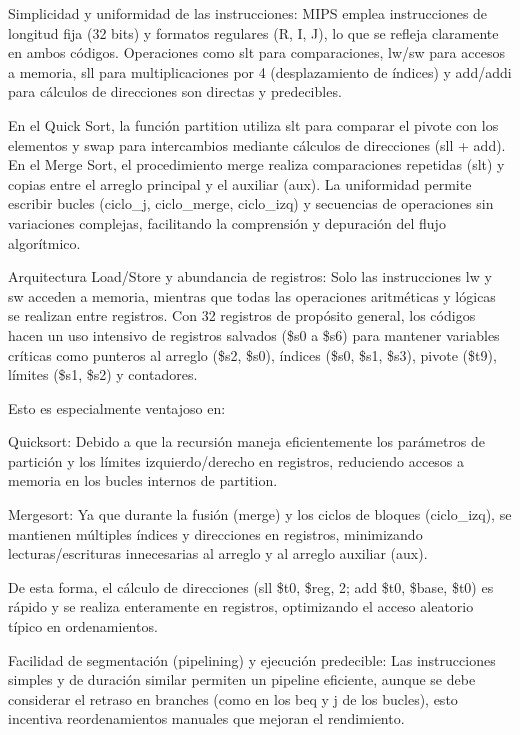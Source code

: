 \documentclass[12pt, letterpaper]{article}
\begin{document}
Simplicidad y uniformidad de las instrucciones: MIPS emplea instrucciones de longitud fija (32 bits) y formatos regulares (R, I, J), lo que se refleja claramente en ambos códigos. Operaciones como slt para comparaciones, lw/sw para accesos a memoria, sll para multiplicaciones por 4 (desplazamiento de índices) y add/addi para cálculos de direcciones son directas y predecibles. 

En el Quick Sort, la función partition utiliza slt para comparar el pivote con los elementos y swap para intercambios mediante cálculos de direcciones (sll + add). En el Merge Sort, el procedimiento merge realiza comparaciones repetidas (slt) y copias entre el arreglo principal y el auxiliar (aux). La uniformidad permite escribir bucles (ciclo\_j, ciclo\_merge, ciclo\_izq) y secuencias de operaciones sin variaciones complejas, facilitando la comprensión y depuración del flujo algorítmico.

Arquitectura Load/Store y abundancia de registros: Solo las instrucciones lw y sw acceden a memoria, mientras que todas las operaciones aritméticas y lógicas se realizan entre registros. Con 32 registros de propósito general, los códigos hacen un uso intensivo de registros salvados (\$s0 a \$s6) para mantener variables críticas como punteros al arreglo (\$s2, \$s0), índices (\$s0, \$s1, \$s3), pivote (\$t9), límites (\$s1, \$s2) y contadores. 

Esto es especialmente ventajoso en:

Quicksort: Debido a que la recursión maneja eficientemente los parámetros de partición y los límites izquierdo/derecho en registros, reduciendo accesos a memoria en los bucles internos de partition.

Mergesort: Ya que durante la fusión (merge) y los ciclos de bloques (ciclo\_izq), se mantienen múltiples índices y direcciones en registros, minimizando lecturas/escrituras innecesarias al arreglo y al arreglo auxiliar (aux).

De esta forma, el cálculo de direcciones (sll \$t0, \$reg, 2; add \$t0, \$base, \$t0) es rápido y se realiza enteramente en registros, optimizando el acceso aleatorio típico en ordenamientos.

Facilidad de segmentación (pipelining) y ejecución predecible: Las instrucciones simples y de duración similar permiten un pipeline eficiente, aunque se debe considerar el retraso en branches (como en los beq y j de los bucles), esto incentiva reordenamientos manuales que mejoran el rendimiento. 
\end{document}
